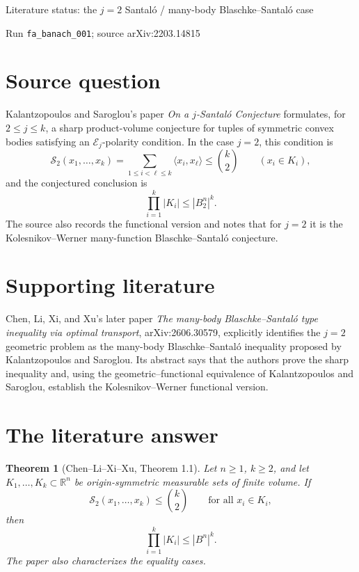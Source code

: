 \documentclass[11pt]{article}
\newtheorem{theorem}{Theorem}
\newcommand{\R}{\mathbb{R}}
\begin{document}
\begin{center}
{\Large Literature status: the \(j=2\) Santaló / many-body Blaschke--Santaló case}

\medskip
{\small Run \texttt{fa\_banach\_001}; source arXiv:2203.14815}
\end{center}

\section*{Source question}

Kalantzopoulos and Saroglou's paper \emph{On a \(j\)-Santaló Conjecture}
formulates, for \(2\leq j\leq k\), a sharp product-volume conjecture for
tuples of symmetric convex bodies satisfying an \(\mathcal{E}_j\)-polarity
condition.  In the case \(j=2\), this condition is
\[
  \mathcal{S}_2(x_1,\ldots,x_k)
  =\sum_{1\leq i<\ell\leq k}\langle x_i,x_\ell\rangle
  \leq {k\choose 2}
  \qquad (x_i\in K_i),
\]
and the conjectured conclusion is
\[
  \prod_{i=1}^k |K_i|\leq |B_2^n|^k.
\]
The source also records the functional version and notes that for \(j=2\) it
is the Kolesnikov--Werner many-function Blaschke--Santaló conjecture.

\section*{Supporting literature}

Chen, Li, Xi, and Xu's later paper \emph{The many-body
Blaschke--Santaló type inequality via optimal transport}, arXiv:2606.30579,
explicitly identifies the \(j=2\) geometric problem as the many-body
Blaschke--Santaló inequality proposed by Kalantzopoulos and Saroglou.  Its
abstract says that the authors prove the sharp inequality and, using the
geometric--functional equivalence of Kalantzopoulos and Saroglou, establish
the Kolesnikov--Werner functional version.

\section*{The literature answer}

\begin{theorem}[Chen--Li--Xi--Xu, Theorem 1.1]
Let \(n\geq 1\), \(k\geq 2\), and let
\(K_1,\ldots,K_k\subset \R^n\) be origin-symmetric measurable sets of finite
volume.  If
\[
  \mathcal{S}_2(x_1,\ldots,x_k)\leq {k\choose 2}
  \qquad\text{for all }x_i\in K_i,
\]
then
\[
  \prod_{i=1}^k |K_i|\leq |B^n|^k.
\]
The paper also characterizes the equality cases.
\end{theorem}
\end{document}
